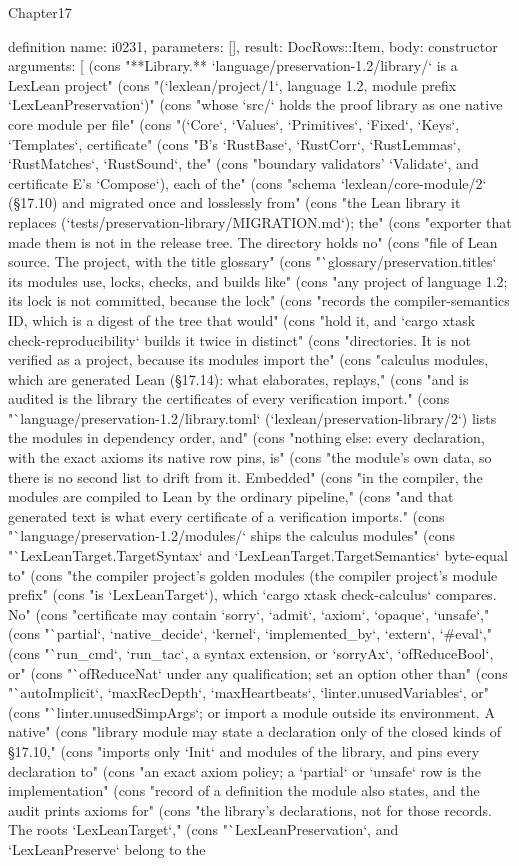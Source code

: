 \begin{lexlean}{Chapter17}
\begin{semanticmodule}
definition{
  name: i0231,
  parameters: [],
  result: DocRows::Item,
  body: constructor{
    arguments: [
      (cons "**Library.** `language/preservation-1.2/library/` is a LexLean project" (cons "(`lexlean/project/1`, language 1.2, module prefix `LexLeanPreservation`)" (cons "whose `src/` holds the proof library as one native core module per file" (cons "(`Core`, `Values`, `Primitives`, `Fixed`, `Keys`, `Templates`, certificate" (cons "B's `RustBase`, `RustCorr`, `RustLemmas`, `RustMatches`, `RustSound`, the" (cons "boundary validators' `Validate`, and certificate E's `Compose`), each of the" (cons "schema `lexlean/core-module/2` (§17.10) and migrated once and losslessly from" (cons "the Lean library it replaces (`tests/preservation-library/MIGRATION.md`); the" (cons "exporter that made them is not in the release tree. The directory holds no" (cons "file of Lean source. The project, with the title glossary" (cons "`glossary/preservation.titles` its modules use, locks, checks, and builds like" (cons "any project of language 1.2; its lock is not committed, because the lock" (cons "records the compiler-semantics ID, which is a digest of the tree that would" (cons "hold it, and `cargo xtask check-reproducibility` builds it twice in distinct" (cons "directories. It is not verified as a project, because its modules import the" (cons "calculus modules, which are generated Lean (§17.14): what elaborates, replays," (cons "and is audited is the library the certificates of every verification import." (cons "`language/preservation-1.2/library.toml` (`lexlean/preservation-library/2`) lists the modules in dependency order, and" (cons "nothing else: every declaration, with the exact axioms its native row pins, is" (cons "the module's own data, so there is no second list to drift from it. Embedded" (cons "in the compiler, the modules are compiled to Lean by the ordinary pipeline," (cons "and that generated text is what every certificate of a verification imports." (cons "`language/preservation-1.2/modules/` ships the calculus modules" (cons "`LexLeanTarget.TargetSyntax` and `LexLeanTarget.TargetSemantics` byte-equal to" (cons "the compiler project's golden modules (the compiler project's module prefix" (cons "is `LexLeanTarget`), which `cargo xtask check-calculus` compares. No" (cons "certificate may contain `sorry`, `admit`, `axiom`, `opaque`, `unsafe`," (cons "`partial`, `native_decide`, `kernel`, `implemented_by`, `extern`, `#eval`," (cons "`run_cmd`, `run_tac`, a syntax extension, or `sorryAx`, `ofReduceBool`, or" (cons "`ofReduceNat` under any qualification; set an option other than" (cons "`autoImplicit`, `maxRecDepth`, `maxHeartbeats`, `linter.unusedVariables`, or" (cons "`linter.unusedSimpArgs`; or import a module outside its environment. A native" (cons "library module may state a declaration only of the closed kinds of §17.10," (cons "imports only `Init` and modules of the library, and pins every declaration to" (cons "an exact axiom policy; a `partial` or `unsafe` row is the implementation" (cons "record of a definition the module also states, and the audit prints axioms for" (cons "the library's declarations, not for those records. The roots `LexLeanTarget`," (cons "`LexLeanPreservation`, and `LexLeanPreserve` belong to the }}
\end{semanticmodule}
\end{lexlean}
